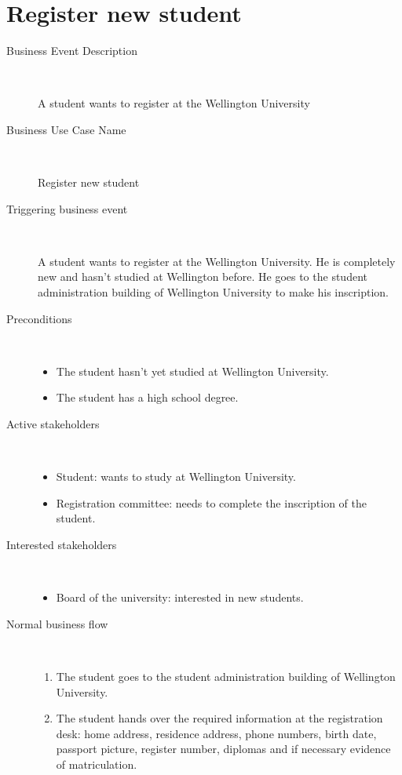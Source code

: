 \section{Register new student}
\label{register-new-student}

\begin{description}
	\item[Business Event Description] \
	\par A student wants to register at the Wellington
	University
	\item[Business Use Case Name] \
	\par Register new student
	\item[Triggering business event] \
	\par A student wants to register at the Wellington
	University. He is completely new and hasn't studied at Wellington before. He
	goes to the student administration building of Wellington University to make
	his inscription.
	\item[Preconditions] \ 
	\begin{itemize}
		\item The student hasn't yet studied at Wellington University.
		\item The student has a high school degree.
	\end{itemize}
	\item[Active stakeholders] \ 
	\begin{itemize}
	  	\item Student: wants to study at Wellington University.
		\item Registration committee: needs to complete the inscription of the student.
	\end{itemize}
	\item[Interested stakeholders] \ 
		\begin{itemize}
		  \item Board of the university: interested in new students.
		\end{itemize}
	\item[Normal business flow] \
	\begin{enumerate}
	  	\item The student goes to the student administration building of Wellington
	  	University.
	  	\item The student hands over the required information at the registration
	  	desk: home address, residence address, phone numbers, birth date, passport
	  	picture, register number, diplomas and if necessary evidence of
	  	matriculation.

\end{enumerate}
\end{description}
